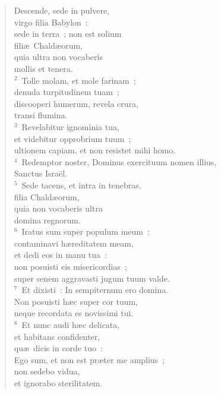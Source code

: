 \begin{flushleft}\begin{verse}\vspace{-19pt}\hspace{6pt}Descende, sede in pulvere,\\\hspace{6pt} virgo filia Babylon~:\\ sede in terra~; non est solium\\ fili\ae\ Chald\ae orum,\\ quia ultra non vocaberis\\ mollis et tenera.\\
${}^{2}$~Tolle molam, et mole farinam~;\\ denuda turpitudinem tuam~;\\ discooperi humerum, revela crura,\\ transi flumina.\\
${}^{3}$~Revelabitur ignominia tua,\\ et videbitur opprobrium tuum~;\\ ultionem capiam, et non resistet mihi homo.\\
${}^{4}$~Redemptor noster, Dominus exercituum nomen illius,\\ Sanctus Isra\"el.\\
${}^{5}$~Sede tacens, et intra in tenebras,\\ filia Chald\ae orum,\\ quia non vocaberis ultra\\ domina regnorum.\\
${}^{6}$~Iratus sum super populum meum~:\\ contaminavi h\ae reditatem meam,\\ et dedi eos in manu tua~:\\ non posuisti eis misericordias~;\\ super senem aggravasti jugum tuum valde.\\
${}^{7}$~Et dixisti~: In sempiternum ero domina.\\ Non posuisti h\ae c super cor tuum,\\ neque recordata es novissimi tui.\\
${}^{8}$~Et nunc audi h\ae c delicata,\\ et habitans confidenter,\\ qu\ae\ dicis in corde tuo~:\\ Ego sum, et non est pr\ae ter me amplius~;\\ non sedebo vidua,\\ et ignorabo sterilitatem.\\

\end{verse}
\end{flushleft}

